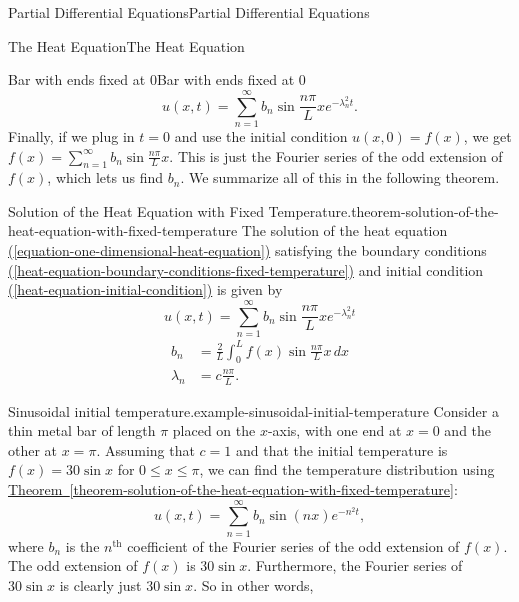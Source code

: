 \documentclass[10pt,]{book}
\numberwithin{equation}{section}
\renewcommand{\th}{\text{th}}
\begin{document}
\begin{chapterptx}{Partial Differential Equations}{}{Partial Differential Equations}{}{}
\begin{sectionptx}{The Heat Equation}{}{The Heat Equation}{}{}
\begin{subsectionptx}{Bar with ends fixed at \(0\)}{}{Bar with ends fixed at \(0\)}{}{}
%
\begin{equation*}
u(x,t) = \sum_{n=1}^{\infty}b_{n}\sin\frac{n\pi}{L}x e^{-\lambda^{2}_{n}t}.
\end{equation*}
\hypertarget{p-513}{}%
Finally, if we plug in \(t=0\) and use the initial condition \(u(x,0) = f(x)\), we get \(f(x) = \sum_{n=1}^{\infty}b_{n}\sin\frac{n\pi}{L}x\). This is just the Fourier series of the odd extension of \(f(x)\), which lets us find \(b_{n}\). We summarize all of this in the following theorem.%
\begin{theorem}{Solution of the Heat Equation with Fixed Temperature.}{}{theorem-solution-of-the-heat-equation-with-fixed-temperature}%
\hypertarget{p-514}{}%
The solution of the heat equation \hyperref[equation-one-dimensional-heat-equation]{(\ref{equation-one-dimensional-heat-equation})} satisfying the boundary conditions \hyperref[heat-equation-boundary-conditions-fixed-temperature]{(\ref{heat-equation-boundary-conditions-fixed-temperature})} and initial condition \hyperref[heat-equation-initial-condition]{(\ref{heat-equation-initial-condition})} is given by%
%
\begin{equation}
u(x,t) = \sum_{n=1}^{\infty}b_{n}\sin\frac{n\pi}{L}x e^{-\lambda^{2}_{n}t}\label{heat-equation-fixed-ends-solution}
\end{equation}
%
\begin{align}
b_{n} & = \frac{2}{L}\int_{0}^{L}f(x)\sin\frac{n\pi}{L}x\,dx \label{heat-equation-fixed-ends-solution-coeff}\\
\lambda_{n} & = c\frac{n\pi}{L}. \label{heat-equation-fixed-ends-solution-exponent}
\end{align}
\end{theorem}
\begin{example}{Sinusoidal initial temperature.}{example-sinusoidal-initial-temperature}%
\hypertarget{p-515}{}%
Consider a thin metal bar of length \(\pi\) placed on the \(x\)-axis, with one end at \(x=0\) and the other at \(x=\pi\). Assuming that \(c=1\) and that the initial temperature is \(f(x) = 30\sin x\) for \(0\leq x\leq\pi\), we can find the temperature distribution using \hyperref[theorem-solution-of-the-heat-equation-with-fixed-temperature]{Theorem~\ref{theorem-solution-of-the-heat-equation-with-fixed-temperature}}:%
%
\begin{equation*}
u(x,t) = \sum_{n=1}^{\infty}b_{n}\sin(n x)e^{-n^{2}t},
\end{equation*}
\hypertarget{p-516}{}%
where \(b_{n}\) is the \(n^{\th}\) coefficient of the Fourier series of the odd extension of \(f(x)\). The odd extension of \(f(x)\) is \(30\sin x\). Furthermore, the Fourier series of \(30\sin x\) is clearly just \(30\sin x\). So in other words,%

\end{example}
\end{subsectionptx}
\end{sectionptx}
\end{chapterptx}
\end{document}
